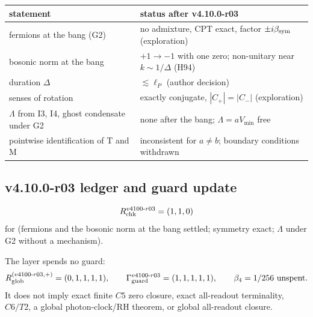 \begin{center}
\small
\begin{tabular}{@{}>{\raggedright\arraybackslash}p{}>{\raggedright\arraybackslash}p{}@{}}
\toprule
statement & status after v4.10.0-r03\\
\midrule
fermions at the bang (G2) & no admixture, CPT exact, factor \(\pm i\beta_{\rm sym}\) (exploration)\\
bosonic norm at the bang & \(+1\to-1\) with one zero; non-unitary near \(k\sim1/\Delta\) (H94)\\
duration \(\Delta\) & \(\lesssim\ell_P\) (author decision)\\
senses of rotation & exactly conjugate, \(|C_+|=|C_-|\) (exploration)\\
\(\Lambda\) from I3, I4, ghost condensate under G2 & none after the bang; \(\Lambda=aV_{\min}\) free\\
pointwise identification of T and M & inconsistent for \(a\neq b\); boundary conditions withdrawn\\
\bottomrule
\end{tabular}
\end{center}

\subsection*{v4.10.0-r03 ledger and guard update}
\label{subsec:v4100-r03-ledger-guard}

\[
R_{\rm chk}^{v4100\text{-}r03}=(1,1,0)
\]
for (fermions and the bosonic norm at the bang settled; symmetry exact; \(\Lambda\) under G2 without a mechanism).

The layer spends no guard:
\[
R_{\rm glob}^{(v4100\text{-}r03,+)}=(0,1,1,1,1),
\qquad
\Gamma_{\rm guard}^{v4100\text{-}r03}=(1,1,1,1,1),
\qquad
\beta_4=1/256\ \text{unspent}.
\]
It does not imply exact finite \(C5\) zero closure, exact all-readout terminality,
\(C6/T2\), a global photon-clock/RH theorem, or global all-readout closure.
